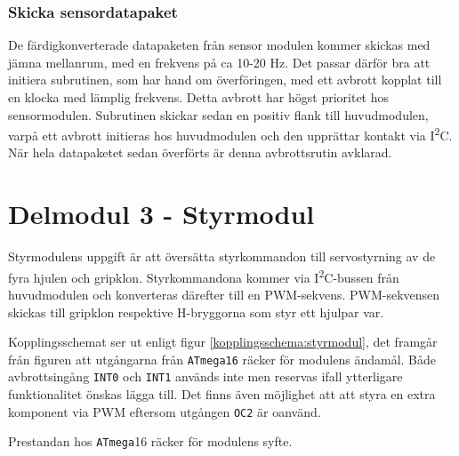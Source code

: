 \documentclass[11pt]{article}
\begin{document}
\begin{flushleft}
\subsubsection{Skicka sensordatapaket}
De färdigkonverterade datapaketen från sensor modulen kommer skickas med jämna mellanrum, med en frekvens på ca 10-20 Hz. Det passar därför bra att initiera subrutinen, som har hand om överföringen, med ett avbrott kopplat till en klocka med lämplig frekvens. Detta avbrott har högst prioritet hos sensormodulen. Subrutinen skickar sedan en positiv flank till huvudmodulen, varpå ett avbrott initieras hos huvudmodulen och den upprättar kontakt via I\textsuperscript{2}C. När hela datapaketet sedan överförts är denna avbrottsrutin avklarad.

\pagebreak
\section{Delmodul 3 - Styrmodul}
Styrmodulens uppgift är att översätta styrkommandon till servostyrning av de fyra hjulen och gripklon. Styrkommandona kommer via I\textsuperscript{2}C-bussen från huvudmodulen och konverteras därefter till en PWM-sekvens. PWM-sekvensen skickas till gripklon respektive H-bryggorna som styr ett hjulpar var. 

Kopplingsschemat ser ut enligt figur \ref{kopplingsschema:styrmodul}, det framgår från figuren att utgångarna från \verb+ATmega16+ räcker för modulens ändamål. Både avbrottsingång \verb+INT0+ och \verb+INT1+ används inte men reservas ifall ytterligare funktionalitet önskas lägga till. Det finns även möjlighet att att styra en extra komponent via PWM eftersom utgången \verb+OC2+ är oanvänd.  

Prestandan hos \verb+ATmega+16 räcker för modulens syfte. 


\end{flushleft}
\end{document}
